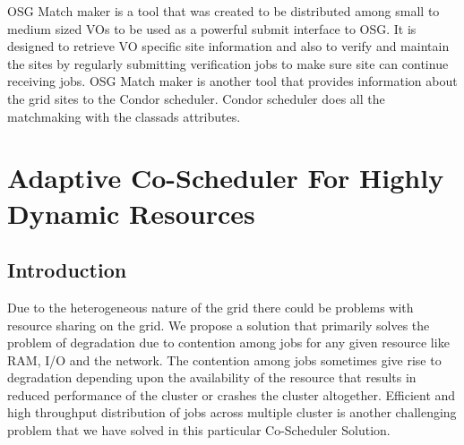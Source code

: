 \documentclass[ms,electronic,double]{nuthesis}
\begin{document}
OSG Match maker is a tool that was created to be distributed among small to 
medium sized VOs to be used as a powerful submit interface to OSG. It is 
designed to retrieve VO specific site information and also to verify and 
maintain the sites by regularly submitting verification jobs to make sure site 
can continue receiving jobs.
OSG Match maker is another tool that provides information about the grid sites to the 
Condor scheduler. Condor scheduler does all the matchmaking with the classads attributes. 
  

\chapter{Adaptive Co-Scheduler For Highly Dynamic Resources}

\section{Introduction}
Due to the heterogeneous nature of the grid there could be problems with resource sharing on the grid. We propose a solution that primarily solves the problem of degradation due to contention among 
jobs for any given resource like RAM, I/O and the network. The contention among jobs sometimes give rise to 
degradation depending upon the availability of the resource that results in reduced performance of the cluster or crashes the cluster
altogether. Efficient and high throughput
distribution of jobs across multiple cluster is another challenging problem that we have solved in 
this particular Co-Scheduler Solution. 
\end{document}

